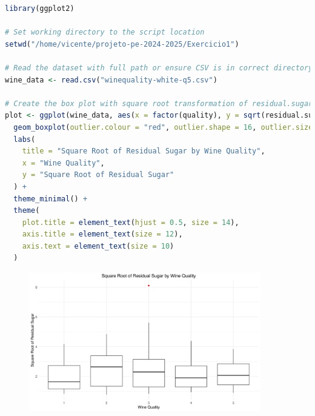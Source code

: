 \documentclass[11pt,a4paper]{article}
\begin{document}
\begin{lstlisting}[language=R]
library(ggplot2)

# Set working directory to the script location
setwd("/home/vicente/projeto-pe-2024-2025/Exercicio1")

# Read the dataset with full path or ensure CSV is in correct directory
wine_data <- read.csv("winequality-white-q5.csv")

# Create the box plot with square root transformation of residual.sugar
plot <- ggplot(wine_data, aes(x = factor(quality), y = sqrt(residual.sugar))) +
  geom_boxplot(outlier.colour = "red", outlier.shape = 16, outlier.size = 2) +
  labs(
    title = "Square Root of Residual Sugar by Wine Quality",
    x = "Wine Quality",
    y = "Square Root of Residual Sugar"
  ) +
  theme_minimal() +
  theme(
    plot.title = element_text(hjust = 0.5, size = 14),
    axis.title = element_text(size = 12),
    axis.text = element_text(size = 10)
  )
\end{lstlisting}

\vspace{1cm}

\begin{figure}[htbp]
    \centering
    \includegraphics[width=0.9\textwidth]{wine_quality_boxplot.png}
\end{figure}
\end{document}
